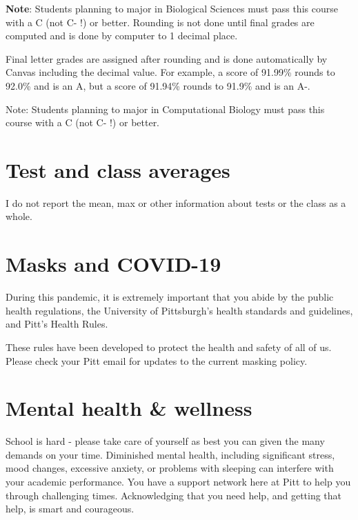 \documentclass[
]{book}
\begin{document}
\textbf{Note}: Students planning to major in Biological Sciences must pass this course with a C (not C- !) or better. Rounding is not done until final grades are computed and is done by computer to 1 decimal place.

Final letter grades are assigned after rounding and is done automatically by Canvas including the decimal value. For example, a score of 91.99\% rounds to 92.0\% and is an A, but a score of 91.94\% rounds to 91.9\% and is an A-.

Note: Students planning to major in Computational Biology must pass this course with a C (not C- !) or better.

\hypertarget{test-and-class-averages}{%
\chapter{Test and class averages}\label{test-and-class-averages}}

I do not report the mean, max or other information about tests or the class as a whole.

\hypertarget{masks-and-covid-19}{%
\chapter{Masks and COVID-19}\label{masks-and-covid-19}}

During this pandemic, it is extremely important that you abide by the public health regulations, the University of Pittsburgh's health standards and guidelines, and Pitt's Health Rules.

These rules have been developed to protect the health and safety of all of us. Please check your Pitt email for updates to the current masking policy.

\hypertarget{mental-health-wellness}{%
\chapter{Mental health \& wellness}\label{mental-health-wellness}}

School is hard - please take care of yourself as best you can given the many demands on your time. Diminished mental health, including significant stress, mood changes, excessive anxiety, or problems with sleeping can interfere with your academic performance. You have a support network here at Pitt to help you through challenging times. Acknowledging that you need help, and getting that help, is smart and courageous.
\end{document}
